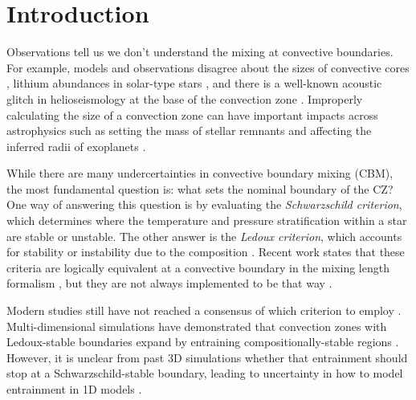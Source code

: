 
\section{Introduction}
\label{sec:introduction}
Observations tell us we don't understand the mixing at convective boundaries.
For example, models and observations disagree about the sizes of convective cores \citep{claret_torres_2018, viani_basu_2020, pedersen_etal_20201}, lithium abundances in solar-type stars \citep{pinsonneault_1997, sestito_randich_2005, carlos_etal_2019, dumont_etal_2021}, and there is a well-known acoustic glitch in helioseismology at the base of the convection zone \citep[see][Sec.~7.2.1]{basu_2016}.
Improperly calculating the size of a convection zone can have important impacts across astrophysics such as setting the mass of stellar remnants \citep{farmer_etal_2019, mehta_etal_2022} and affecting the inferred radii of exoplanets \citep{basu_etal_2012, morrell_2020}.

While there are many undercertainties in convective boundary mixing (CBM), the most fundamental question is: what sets the nominal boundary of the CZ? 
One way of answering this question is by evaluating the \emph{Schwarzschild criterion}, which determines where the temperature and pressure stratification within a star are stable or unstable.
The other answer is the \emph{Ledoux criterion}, which accounts for stability or instability due to the composition \citep[e.g., the variation of helium abundance with pressure; see][chapter 3, for a nice review of these criteria]{salaris_cassisi_2017}.
Recent work states that these criteria are logically equivalent at a convective boundary in the mixing length formalism \citep{gabriel_etal_2014, mesa4, mesa5}, but they are not always implemented to be that way \citep[as in early versions of the MESA instrument,][]{mesa2}.

Modern studies still have not reached a consensus of which criterion to employ \citep[see][chapter 2, for a brief discussion]{kaiser_etal_2020}.
Multi-dimensional simulations have demonstrated that convection zones with Ledoux-stable boundaries expand by entraining compositionally-stable regions \citep{meakin_arnett_2007, woodward_etal_2015, jones_etal_2017, cristini_etal_2019, fuentes_cumming_2020, andrassy_etal_2020, andrassy_etal_2021}.
However, it is unclear from past 3D simulations whether that entrainment should stop at a Schwarzschild-stable boundary, leading to uncertainty in how to model entrainment in 1D models \citep{staritsin_2013, scott_etal_2021}.

